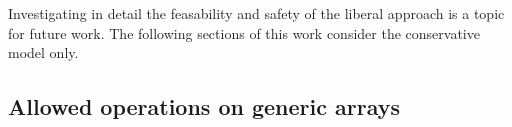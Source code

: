 Investigating in detail the feasability and safety of the liberal approach
is a topic for future work. The following sections of this work consider the
conservative model only.













\subsection{Allowed operations on generic arrays}

